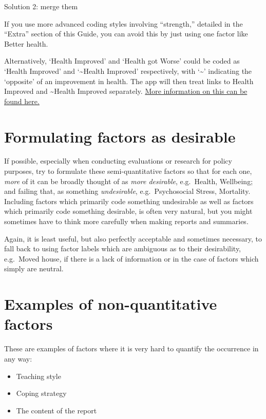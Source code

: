 \documentclass[
]{book}
\providecommand{\tightlist}{%
  \setlength{\itemsep}{0pt}\setlength{\parskip}{0pt}}
\begin{document}
Solution 2: merge them

If you use more advanced coding styles involving ``strength,'' detailed in the ``Extra'' section of this Guide, you can avoid this by just using one factor like Better health.

Alternatively, `Health Improved' and `Health got Worse' could be coded as `Health Improved' and `\textasciitilde Health Improved' respectively, with `\textasciitilde{}' indicating the `opposite' of an improvement in health. The app will then treat links to Health Improved and \textasciitilde Health Improved separately. \href{https://guide.causalmap.app/coding-opposites.html\#combining-opposites}{More information on this can be found here.}

\hypertarget{formulating-factors-as-desirable}{%
\section{Formulating factors as desirable}\label{formulating-factors-as-desirable}}

If possible, especially when conducting evaluations or research for policy purposes, try to formulate these semi-quantitative factors so that for each one, \emph{more} of it can be broadly thought of as \emph{more desirable}, e.g.~Health, Wellbeing; and failing that, as something \emph{undesirable}, e.g.~Psychosocial Stress, Mortality. Including factors which primarily code something undesirable as well as factors which primarily code something desirable, is often very natural, but you might sometimes have to think more carefully when making reports and summaries.

Again, it is least useful, but also perfectly acceptable and sometimes necessary, to fall back to using factor labels which are ambiguous as to their desirability, e.g.~Moved house\emph{,} if there is a lack of information or in the case of factors which simply are neutral.

\hypertarget{examples-of-non-quantitative-factors}{%
\section{Examples of non-quantitative factors}\label{examples-of-non-quantitative-factors}}

These are examples of factors where it is very hard to quantify the occurrence in any way:

\begin{itemize}
\tightlist
\item
  Teaching style
\item
  Coping strategy
\item
  The content of the report
\end{itemize}
\end{document}
